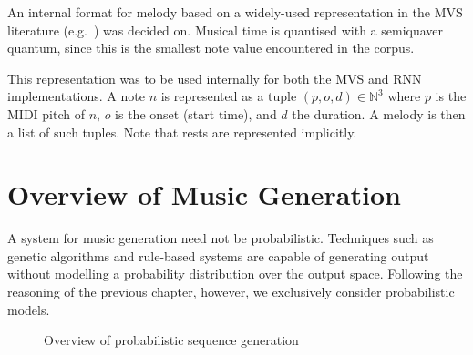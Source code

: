 \documentclass[12pt,a4paper,twoside,openright]{report}
\begin{document}
An internal format for melody based on a widely-used representation in the MVS
literature (e.g.\ \cite{conklin1995viewpoints}) was decided on. Musical time is
quantised with a semiquaver quantum, since this is the smallest note value
encountered in the corpus.

This representation was to be used internally for both the MVS and RNN
implementations. A note $n$ is represented as a tuple $(p,o,d) \in \mathbb{N}^3$
where $p$ is the MIDI pitch of $n$, $o$ is the onset (start time), and $d$ the
duration. A melody is then a list of such tuples. Note that rests are
represented implicitly.

\section{Overview of Music Generation}\label{sec:gen-models}

A system for music generation need not be probabilistic. Techniques such as
genetic algorithms and rule-based systems are capable of generating output
without modelling a probability distribution over the output space. Following
the reasoning of the previous chapter, however, we exclusively consider
probabilistic models. 

\begin{figure}[H]
\centering
{}
\caption{Overview of probabilistic sequence generation}
\label{fig:seq-gen-overview}
\end{figure}
\end{document}
